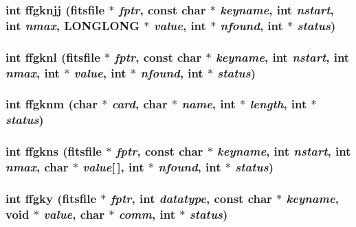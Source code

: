 \subsubsection{\setlength{\rightskip}{0pt plus 5cm}int ffgknjj (\bf{fitsfile} $\ast$ {\em fptr}, const char $\ast$ {\em keyname}, int {\em nstart}, int {\em nmax}, \bf{LONGLONG} $\ast$ {\em value}, int $\ast$ {\em nfound}, int $\ast$ {\em status})}\label{fitsio__64_8h_ee677f0afd09400ba347a5fbab847265}


\subsubsection{\setlength{\rightskip}{0pt plus 5cm}int ffgknl (\bf{fitsfile} $\ast$ {\em fptr}, const char $\ast$ {\em keyname}, int {\em nstart}, int {\em nmax}, int $\ast$ {\em value}, int $\ast$ {\em nfound}, int $\ast$ {\em status})}\label{fitsio__64_8h_8fe8509bc4d3ae7ff3befcf82289f7e0}


\subsubsection{\setlength{\rightskip}{0pt plus 5cm}int ffgknm (char $\ast$ {\em card}, char $\ast$ {\em name}, int $\ast$ {\em length}, int $\ast$ {\em status})}\label{fitsio__64_8h_45d087a72475336587134aca9be1bf93}


\subsubsection{\setlength{\rightskip}{0pt plus 5cm}int ffgkns (\bf{fitsfile} $\ast$ {\em fptr}, const char $\ast$ {\em keyname}, int {\em nstart}, int {\em nmax}, char $\ast$ {\em value}[$\,$], int $\ast$ {\em nfound}, int $\ast$ {\em status})}\label{fitsio__64_8h_7907624ccd817f3c7331ce07016e790c}


\subsubsection{\setlength{\rightskip}{0pt plus 5cm}int ffgky (\bf{fitsfile} $\ast$ {\em fptr}, int {\em datatype}, const char $\ast$ {\em keyname}, void $\ast$ {\em value}, char $\ast$ {\em comm}, int $\ast$ {\em status})}\label{fitsio__64_8h_1432368d15be90a252a794df7f9ad09c}


